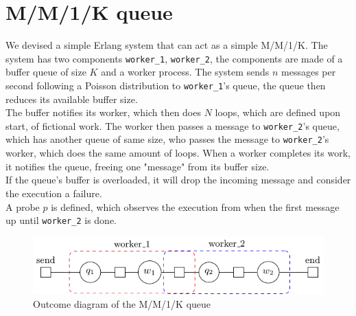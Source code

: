 \section{M/M/1/K queue}
    We devised a simple Erlang system that can act as a simple M/M/1/K.
        The system has two components \texttt{worker\_1}, \texttt{worker\_2}, the components are made of a buffer queue of size $K$ and a worker process.
    The system sends $n$ messages per second following a Poisson distribution to \texttt{worker\_1}'s queue, the queue then reduces its available buffer size. \\
    The buffer notifies its worker, which then does $N$ loops, which are defined upon start, of fictional work. The worker then passes a message to \texttt{worker\_2}'s queue, which has another queue of same size, who passes the message to \texttt{worker\_2}'s worker, which does the same amount of loops. When a worker completes its work, it notifies the queue, freeing one "message" from its buffer size. \\
    If the queue's buffer is overloaded, it will drop the incoming message and consider the execution a failure. \\
    A probe $p$ is defined, which observes the execution from when the first message up until \texttt{worker\_2} is done.
    \begin{figure}[H]
        \begin{center}
            \includegraphics[scale=1.2, width=\textwidth]{tikz/mm1k.pdf} 
        \end{center}
        \caption{Outcome diagram of the M/M/1/K queue}
    \end{figure}
